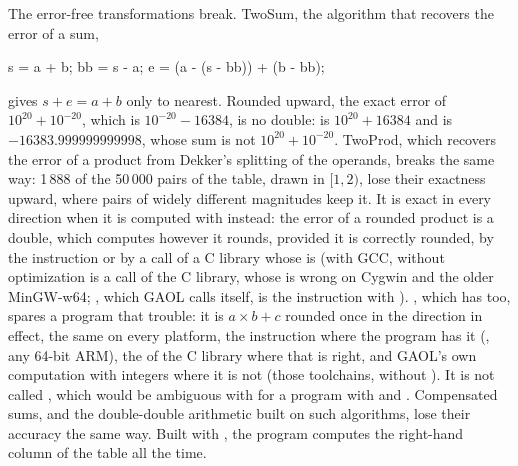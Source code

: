 \medskip
The error-free transformations break. TwoSum, the algorithm that recovers the
error of a sum,

\begin{example}
s = a + b;  bb = s - a;  e = (a - (s - bb)) + (b - bb);
\end{example}

\noindent
gives $s+e=a+b$ only to nearest. Rounded upward, the exact error of
$10^{20}+10^{-20}$, which is $10^{-20}-16384$, is no double:  is
$10^{20}+16384$ and  is $-16383.999999999998$, whose sum is not
$10^{20}+10^{-20}$. TwoProd, which recovers the error of a product from
Dekker's splitting of the operands, breaks the same way: 1\,888 of the
50\,000 pairs of the table, drawn in $[1,2)$, lose their exactness upward,
where pairs of widely different magnitudes keep it. It
is exact in every direction when it is computed with  instead:
the error of a rounded product is a double, which  computes
however it rounds, provided it is correctly rounded, by the instruction or by
a call of a C library whose  is (with GCC,  without
optimization is a call of the C library, whose  is wrong on
Cygwin and the older MinGW-w64; , which GAOL calls
itself, is the instruction with ). ,
which  has too, spares a program that trouble: it is
$a\times b + c$ rounded once in the direction in effect, the same on every
platform, the instruction where the program has it (, any 64-bit
ARM), the  of the C library where that is right, and GAOL's own
computation with integers where it is not (those toolchains, without
). It is not called , which would be ambiguous with
 for a program with  and
. Compensated sums, and the
double-double arithmetic built on such algorithms, lose their accuracy the
same way. Built with , the program computes
the right-hand column of the table all the time.

